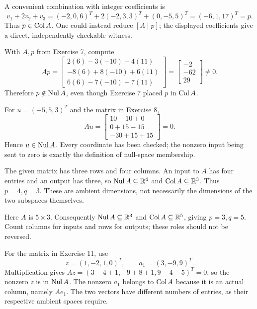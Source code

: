 A convenient combination with integer coefficients is
\[
 v_1+2v_2+v_3=(-2,0,6)^T+2(-2,3,3)^T+(0,-5,5)^T
 =(-6,1,17)^T=p.
\]
Thus $p\in\operatorname{Col} A$. One could instead reduce $[A\mid p]$;
the displayed coefficients give a direct, independently checkable witness.

With $A,p$ from Exercise 7, compute
\[
 Ap=\begin{bmatrix}2(6)-3(-10)-4(11)\\
 -8(6)+8(-10)+6(11)\\6(6)-7(-10)-7(11)\end{bmatrix}
 =\begin{bmatrix}-2\\-62\\29\end{bmatrix}\ne0.
\]
Therefore $p\notin\operatorname{Nul} A$, even though Exercise 7 placed $p$ in $\operatorname{Col} A$.

For $u=(-5,5,3)^T$ and the matrix in Exercise 8,
\[
 Au=\begin{bmatrix}10-10+0\\0+15-15\\-30+15+15\end{bmatrix}=0.
\]
Hence $u\in\operatorname{Nul} A$. Every coordinate has been checked; the nonzero
input being sent to zero is exactly the definition of null-space membership.

The given matrix has three rows and four columns.
An input to $A$ has four entries and an output has three, so
$\operatorname{Nul} A\subseteq\mathbb{R}^4$ and $\operatorname{Col} A\subseteq\mathbb{R}^3$.
Thus $\boxed{p=4,q=3}$. These are ambient dimensions, not necessarily
the dimensions of the two subspaces themselves.

Here $A$ is $5\times3$. Consequently
$\operatorname{Nul} A\subseteq\mathbb{R}^3$ and $\operatorname{Col} A\subseteq\mathbb{R}^5$,
giving $\boxed{p=3,q=5}$.
Count columns for inputs and rows for outputs; these roles should not be reversed.

For the matrix in Exercise 11, use
\[
 z=(1,-2,1,0)^T,\qquad a_1=(3,-9,9)^T.
\]
Multiplication gives $Az=(3-4+1,-9+8+1,9-4-5)^T=0$,
so the nonzero $z$ is in $\operatorname{Nul} A$.
The nonzero $a_1$ belongs to $\operatorname{Col} A$ because it is an actual column,
namely $Ae_1$. The two vectors have different numbers of entries, as their
respective ambient spaces require.


